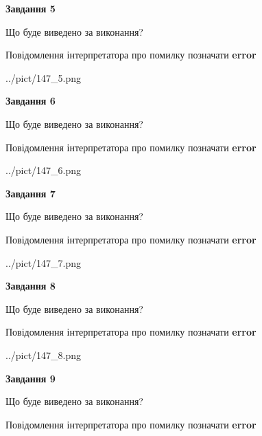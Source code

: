 \documentclass[11pt, ukrainian]{article}
\begin{document}
{\begin {large}
{\begin {center}\textbf{Завдання 5}\end {center}}\par
Що буде виведено за виконання? \par
Повідомлення інтерпретатора про помилку позначати \textbf{error}

\begin{center}
	{../pict/147_5.png}
\end{center}
\newpage

{\begin {center}\textbf{Завдання 6}\end {center}}\par
Що буде виведено за виконання? \par
Повідомлення інтерпретатора про помилку позначати \textbf{error}

\begin{center}
	{../pict/147_6.png}
\end{center}
\newpage

{\begin {center}\textbf{Завдання 7}\end {center}}\par
Що буде виведено за виконання? \par
Повідомлення інтерпретатора про помилку позначати \textbf{error}

\begin{center}
	{../pict/147_7.png}
\end{center}
\newpage

{\begin {center}\textbf{Завдання 8}\end {center}}\par
Що буде виведено за виконання? \par
Повідомлення інтерпретатора про помилку позначати \textbf{error}

\begin{center}
	{../pict/147_8.png}
\end{center}
\newpage

{\begin {center}\textbf{Завдання 9}\end {center}}\par
Що буде виведено за виконання? \par
Повідомлення інтерпретатора про помилку позначати \textbf{error}


\end{large}}
\end{document}
